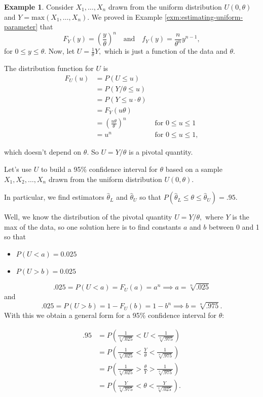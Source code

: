 \documentclass[
]{book}
\providecommand{\tightlist}{%
  \setlength{\itemsep}{0pt}\setlength{\parskip}{0pt}}
\theoremstyle{definition}
\theoremstyle{definition}
\newtheorem{example}{Example}[chapter]
\theoremstyle{definition}
\theoremstyle{definition}
\theoremstyle{remark}
\begin{document}
\begin{example}
Consider \(X_1, \ldots, X_n\) drawn from the uniform distribution \(U(0,\theta)\) and \(Y = \text{max}(X_1, \ldots, X_n)\). We proved in Example \ref{exm:estimating-uniform-parameter} that \[F_Y(y) = \left(\frac{y}{\theta}\right)^n ~~~\text{ and }~~~ f_Y(y) = \frac{n}{\theta^n}y^{n-1},\] for \(0 \leq y \leq \theta\).
Now, let \(U = \frac{1}{\theta}Y,\) which is just a function of the data and \(\theta\).

The distribution function for \(U\) is
\begin{align*}
F_U(u) &= P(U \leq u)\\
      &= P(Y/\theta \leq u)\\
      &= P(Y \leq u\cdot \theta)\\
      &= F_Y(u\theta) \\
      &= \left(\frac{u\theta}{\theta}\right)^n &\text{ for } 0 \leq u \leq 1\\
      &= u^n & \text{ for } 0 \leq u \leq 1,
\end{align*}

which doesn't depend on \(\theta\). So \(U = Y/\theta\) is a pivotal quantity.

Let's use \(U\) to build a 95\% confidence interval for \(\theta\) based on a sample \(X_1, X_2, \ldots, X_n\) drawn from the uniform distribution \(U(0,\theta)\).

In particular, we find estimators \(\hat{\theta}_L\) and \(\hat{\theta}_U\) so that \(P(\hat{\theta}_L \leq \theta \leq \hat{\theta}_U) = .95\).

Well, we know the distribution of the pivotal quantity \(U = Y/\theta,\) where \(Y\) is the max of the data, so one solution here is to find constants \(a\) and \(b\) between 0 and 1 so that

\begin{itemize}
\tightlist
\item
  \(P(U < a) = 0.025\)
\item
  \(P(U > b) = 0.025\)
\end{itemize}

\[.025 = P(U < a) = F_U(a) = a^n \implies a = \sqrt[n]{.025}\]
and
\[.025 = P(U > b) = 1-F_U(b) = 1 - b^n \implies b = \sqrt[n]{.975}.\]
With this we obtain a general form for a 95\% confidence interval for \(\theta\):

\begin{align*}
.95 &= P\left(\frac{1}{\sqrt[n]{.025}} < U < \frac{1}{\sqrt[n]{.975}}\right)\\
    &= P\left(\frac{1}{\sqrt[n]{.025}} < \frac{Y}{\theta} < \frac{1}{\sqrt[n]{.975}}\right)\\
    &= P\left(\frac{1}{\sqrt[n]{.025}} > \frac{\theta}{Y} > \frac{1}{\sqrt[n]{.975}}\right)\\
    &= P\left(\frac{Y}{\sqrt[n]{.975}} < \theta < \frac{Y}{\sqrt[n]{.025}}\right).
\end{align*}


\end{example}
\end{document}
